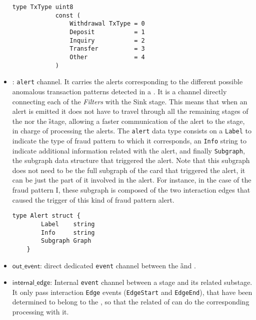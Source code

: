 \begin{itemize}
    \begin{center}
    \lstset{style=golangStyle}
    \begin{lstlisting}[caption={\texttt{TxType} Data Type, for the different interaction types}]
            type TxType uint8
            const (
            	Withdrawal TxType = 0
            	Deposit           = 1
            	Inquiry           = 2
            	Transfer          = 3
            	Other             = 4
            )
    \end{lstlisting}
    \end{center}
    
    \item \alertch: \texttt{alert} channel. It carries the alerts corresponding to the different possible anomalous transaction patterns detected in a \filter. It is a channel directly connecting each of the \emph{Filters} with the Sink stage. This means that when an alert is emitted it does not have to travel through all the remaining \F stages of the \DP nor the \G stage, allowing a faster communication of the alert to the \Sk stage, in charge of processing the alerts. The \texttt{alert} data type consists on a \texttt{Label} to indicate the type of fraud pattern to which it corresponds, an \texttt{Info} string to indicate additional information related with the alert, and finally \texttt{Subgraph}, the subgraph data structure that triggered the alert. Note that this subgraph does not need to be the full subgraph of the card that triggered the alert, it can be just the part of it involved in the alert. For instance, in the case of the fraud pattern I, these subgraph is composed of the two interaction edges that caused the trigger of this kind of fraud pattern alert.
    \begin{center}
    \lstset{style=golangStyle}
    \begin{lstlisting}[caption={\texttt{Alert} Data Type}]
    type Alert struct {
    	Label    string        
    	Info     string        
    	Subgraph Graph         
    }
    \end{lstlisting}
    \end{center}
    \item $\mathsf{out\_event}$: direct dedicated \texttt{event} channel between the \G and \Sk. 
    \item $\mathsf{internal\_edge}$: Internal \texttt{event} channel between a \F stage and its related \FW substage. It only pass interaction \texttt{Edge} events (\texttt{EdgeStart} and \texttt{EdgeEnd}), that have been determined to belong to the \filter, so that the related \FW of \F can do the corresponding processing with it.
  \end{itemize}

